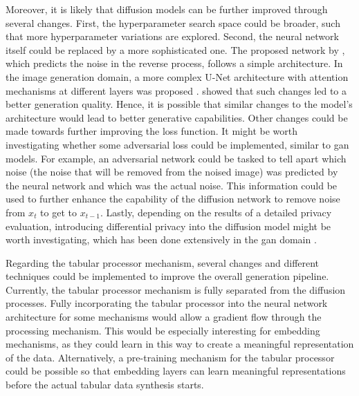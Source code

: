 Moreover, it is likely that diffusion \glspl{model} can be further improved through several changes.
First, the hyperparameter search space could be broader, such that more hyperparameter variations are explored.
Second, the neural network itself could be replaced by a more sophisticated one.
The proposed network by \cite{kotelnikov2022TabDDPMModellingTabular}, which predicts the noise in the reverse process, follows a simple architecture.
In the image generation domain, a more complex U-Net \cite{ronneberger2015UNetConvolutionalNetworks} architecture with attention mechanisms at different layers was proposed \cite{dhariwal2021DiffusionModelsBeat}.
\textcite{dhariwal2021DiffusionModelsBeat} showed that such changes led to a better generation quality.
Hence, it is possible that similar changes to the \gls{model}'s architecture would lead to better generative capabilities.
Other changes could be made towards further improving the loss function.
It might be worth investigating whether some adversarial loss could be implemented, similar to \gls{gan} \glspl{model}.
For example, an adversarial network could be tasked to tell apart which noise (the noise that will be removed from the noised image) was predicted by the neural network and which was the actual noise.
This information could be used to further enhance the capability of the diffusion network to remove noise from $x_{t}$ to get to $x_{t-1}$.
Lastly, depending on the results of a detailed privacy evaluation, introducing differential privacy \cite{dwork2011DifferentialPrivacy} into the diffusion \gls{model} might be worth investigating, which has been done extensively in the \gls{gan} domain \cite{jordon2018PATEGANGeneratingSynthetic,9054559, kunar2021DTGANDifferentialPrivatea, torfi2022DifferentiallyPrivateSynthetic}.

Regarding the tabular processor mechanism, several changes and different techniques could be implemented to improve the overall generation pipeline.
Currently, the tabular processor mechanism is fully separated from the diffusion processes.
Fully incorporating the tabular processor into the neural network architecture for some mechanisms would allow a gradient flow through the processing mechanism.
This would be especially interesting for embedding mechanisms, as they could learn in this way to create a meaningful representation of the data.
Alternatively, a pre-training mechanism for the tabular processor could be possible so that embedding layers can learn meaningful representations before the actual tabular data synthesis starts.

